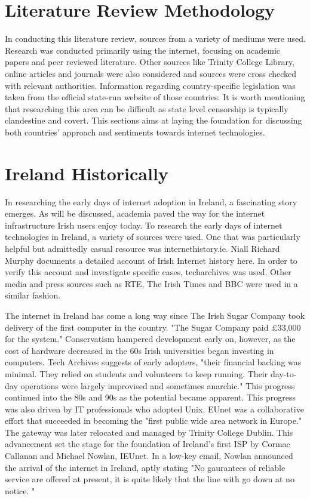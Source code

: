 \section{Literature Review Methodology}

In conducting this literature review, sources from a variety of mediums were used. Research was conducted primarily using the internet, focusing on academic papers and peer reviewed literature. Other sources like Trinity College Library, online articles and journals were also considered and sources were cross checked with relevant authorities. Information regarding country-specific legislation was taken from the official state-run website of those countries. It is worth mentioning that researching this area can be difficult as state level censorship is typically clandestine and covert. This sections aims at laying the foundation for discussing both countries' approach and sentiments towards internet technologies. 

\section{Ireland Historically }
In researching the early days of internet adoption in Ireland, a fascinating story emerges. As will be discussed, academia paved the way for the internet infrastructure Irish users enjoy today. To research the early days of internet technologies in Ireland, a variety of sources were used. One that was particularly helpful but admittedly casual resource was internethistory.ie. \cite{InternetHistoryIE} Niall Richard Murphy documents a detailed account of Irish Internet history here. In order to verify this account and investigate specific cases, techarchives \cite{TechArchivesIE} was used. Other media and press sources such as RTE, The Irish Times and BBC were used in a similar fashion.

The internet in Ireland has come a long way since The Irish Sugar Company took delivery of the first computer in the country. "The Sugar Company paid £33,000 for the system." \cite{irelands_first_computers} Conservatism hampered development early on, however, as the cost of hardware decreased in the 60s Irish universities began investing in computers. Tech Archives suggests of early adopters, "their financial backing was minimal. They relied on students and volunteers to keep running. Their day-to-day operations were largely improvised and sometimes anarchic." \cite{internet_ireland_1987_97} This progress continued into the 80s and 90s as the potential became apparent. This progress was also driven by IT professionals who adopted Unix. EUnet was a collaborative effort that succeeded in becoming the "first public wide area network in Europe." \cite{internet_ireland_1987_97} The gateway was later relocated and managed by Trinity College Dublin. This advancement set the stage for the foundation of Ireland's first ISP by Cormac Callanan and Michael Nowlan, IEUnet. In a low-key email, Nowlan announced the arrival of the internet in Ireland, aptly stating "No gaurantees of reliable service are offered at present, it is quite likely that the line with go down at no notice. " \cite{tcd_scss_t_20160323_001} 

